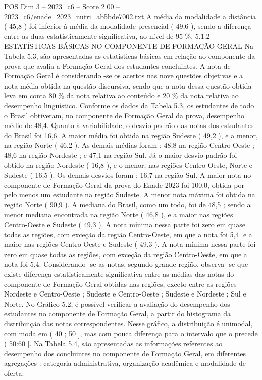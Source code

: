 \begin{textsample}{POS Dim 3 – 2023\_c6 – Score 2.00 – 2023\_c6/enade\_2023\_nutri\_ab5bde7002.txt}
A média da modalidade a distância ( 45,8 ) foi inferior à média da modalidade presencial ( 49,6 ), sendo a diferença entre as duas estatisticamente significativa, ao nível de 95 \%. 5.1.2 ESTATÍSTICAS BÁSICAS NO COMPONENTE DE FORMAÇÃO GERAL Na Tabela 5.3, são apresentadas as estatísticas básicas em relação ao componente da prova que avalia a Formação Geral dos estudantes concluintes.
A nota de Formação Geral é considerando -se os acertos nas nove questões objetivas e a nota média obtida na questão discursiva, sendo que a nota dessa questão obtida leva em conta 80 \% da nota relativa ao conteúdo e 20 \% da nota relativa ao desempenho linguístico.
Conforme os dados da Tabela 5.3, os estudantes de todo o Brasil obtiveram, no componente de Formação Geral da prova, desempenho médio de 48,4.
Quanto à variabilidade, o desvio-padrão das notas dos estudantes do Brasil foi 16,6.
A maior média foi obtida na região Sudeste ( 49,2 ), e a menor, na região Norte ( 46,2 ).
As demais médias foram : 48,8 na região Centro-Oeste ; 48,6 na região Nordeste ; e 47,1 na região Sul.
Já o maior desvio-padrão foi obtido na região Nordeste ( 16,8 ), e o menor, nas regiões Centro-Oeste, Norte e Sudeste ( 16,5 ).
Os demais desvios foram : 16,7 na região Sul.
A maior nota no componente de Formação Geral da prova do Enade 2023 foi 100,0, obtida por pelo menos um estudante na região Sudeste.
A menor nota máxima foi obtida na região Norte ( 90,9 ).
A mediana do Brasil, como um todo, foi de 48,5 ; sendo a menor mediana encontrada na região Norte ( 46,8 ), e a maior nas regiões Centro-Oeste e Sudeste ( 49,3 ).
A nota mínima nessa parte foi zero em quase todas as regiões, com exceção da região Centro-Oeste, em que a nota foi 5,4. e a maior nas regiões Centro-Oeste e Sudeste ( 49,3 ).
A nota mínima nessa parte foi zero em quase todas as regiões, com exceção da região Centro-Oeste, em que a nota foi 5,4.
Considerando -se as notas, segundo grande região, observa -se que existe diferença estatisticamente significativa entre as médias das notas do componente de Formação Geral obtidas nas regiões, exceto entre as regiões Nordeste e Centro-Oeste ; Sudeste e Centro-Oeste ; Sudeste e Nordeste ; Sul e Norte.
No Gráfico 5.2, é possível verificar a avaliação do desempenho dos estudantes no componente de Formação Geral, a partir do histograma da distribuição das notas correspondentes.
Nesse gráfico, a distribuição é unimodal, com moda em ( 40 ; 50 ], mas com pouca diferença para o intervalo que o precede ( 50:60 ].
Na Tabela 5.4, são apresentadas as informações referentes ao desempenho dos concluintes no componente de Formação Geral, em diferentes agregações : categoria administrativa, organização acadêmica e modalidade de oferta.

\end{textsample}
